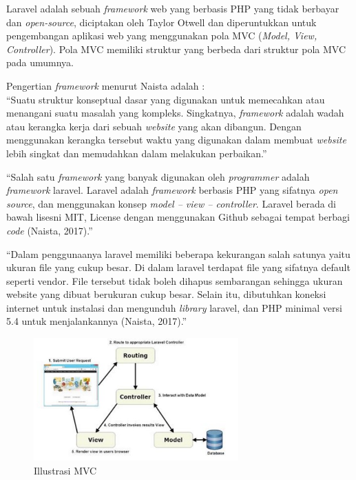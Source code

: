 Laravel adalah sebuah \textit{framework} web yang berbasis PHP yang tidak berbayar dan \textit{open-source}, diciptakan oleh Taylor Otwell dan diperuntukkan untuk pengembangan aplikasi web yang menggunakan pola MVC (\textit{Model, View, Controller}). Pola MVC memiliki struktur yang berbeda dari struktur pola MVC pada umumnya.

Pengertian \textit{framework} menurut Naista adalah : \\
“Suatu struktur konseptual dasar yang digunakan untuk memecahkan atau menangani suatu masalah yang kompleks. Singkatnya, \textit{framework} adalah wadah atau kerangka kerja dari sebuah \textit{website} yang akan dibangun. Dengan menggunakan kerangka tersebut waktu yang digunakan dalam membuat \textit{website} lebih singkat dan memudahkan dalam melakukan perbaikan.”

“Salah satu \textit{framework} yang banyak digunakan oleh \textit{programmer} adalah \textit{framework} laravel. Laravel adalah \textit{framework} berbasis PHP yang sifatnya \textit{open source}, dan menggunakan konsep \textit{model – view – controller}. Laravel berada di bawah lisesni MIT, License dengan menggunakan Github sebagai tempat berbagi \textit{code} (Naista, 2017).”

“Dalam penggunaanya laravel memiliki beberapa kekurangan salah satunya yaitu ukuran file yang cukup besar. Di dalam laravel terdapat file yang sifatnya default seperti vendor. File tersebut tidak boleh dihapus sembarangan sehingga ukuran website yang dibuat berukuran cukup besar. Selain itu, dibutuhkan koneksi internet untuk instalasi dan mengunduh \textit{library} laravel, dan PHP minimal versi 5.4 untuk menjalankannya (Naista, 2017).” 

\begin{figure}
	\centering
	\includegraphics[width=0.7\textwidth]
	{pics/ilustrasimvc.jpg}
	\caption{Illustrasi MVC}
	\label{fig:31}
\end{figure}

